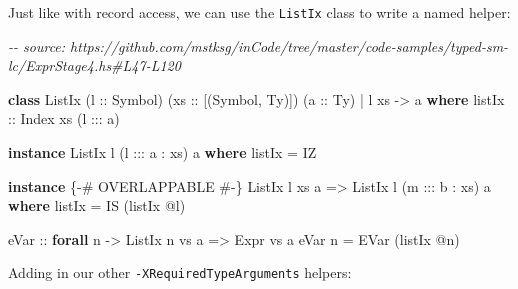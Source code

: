 \documentclass[]{article}
\newenvironment{Shaded}{}{}
\newcommand{\CommentTok}[1]{\textcolor[rgb]{0.38,0.63,0.69}{\textit{#1}}}
\newcommand{\DataTypeTok}[1]{\textcolor[rgb]{0.56,0.13,0.00}{#1}}
\newcommand{\KeywordTok}[1]{\textcolor[rgb]{0.00,0.44,0.13}{\textbf{#1}}}
\newcommand{\NormalTok}[1]{#1}
\newcommand{\OperatorTok}[1]{\textcolor[rgb]{0.40,0.40,0.40}{#1}}
\newcommand{\OtherTok}[1]{\textcolor[rgb]{0.00,0.44,0.13}{#1}}
\begin{document}
Just like with record access, we can use the \texttt{ListIx} class to write a
named helper:

\begin{Shaded}
\begin{Highlighting}[]
\CommentTok{{-}{-} source: https://github.com/mstksg/inCode/tree/master/code{-}samples/typed{-}sm{-}lc/ExprStage4.hs\#L47{-}L120}

\KeywordTok{class} \DataTypeTok{ListIx}\NormalTok{ (}\OtherTok{l ::} \DataTypeTok{Symbol}\NormalTok{) (}\OtherTok{xs ::}\NormalTok{ [(}\DataTypeTok{Symbol}\NormalTok{, }\DataTypeTok{Ty}\NormalTok{)]) (}\OtherTok{a ::} \DataTypeTok{Ty}\NormalTok{) }\OperatorTok{|}\NormalTok{ l xs }\OtherTok{{-}\textgreater{}}\NormalTok{ a }\KeywordTok{where}
\OtherTok{  listIx ::} \DataTypeTok{Index}\NormalTok{ xs (l }\OperatorTok{:::}\NormalTok{ a)}

\KeywordTok{instance} \DataTypeTok{ListIx}\NormalTok{ l (l }\OperatorTok{:::}\NormalTok{ a \textquotesingle{}}\OperatorTok{:}\NormalTok{ xs) a }\KeywordTok{where}
\NormalTok{  listIx }\OtherTok{=} \DataTypeTok{IZ}

\KeywordTok{instance} \OtherTok{\{{-}\# OVERLAPPABLE \#{-}\}} \DataTypeTok{ListIx}\NormalTok{ l xs a }\OtherTok{=\textgreater{}} \DataTypeTok{ListIx}\NormalTok{ l (m }\OperatorTok{:::}\NormalTok{ b \textquotesingle{}}\OperatorTok{:}\NormalTok{ xs) a }\KeywordTok{where}
\NormalTok{  listIx }\OtherTok{=} \DataTypeTok{IS}\NormalTok{ (listIx }\OperatorTok{@}\NormalTok{l)}

\OtherTok{eVar ::} \KeywordTok{forall}\NormalTok{ n }\OtherTok{{-}\textgreater{}} \DataTypeTok{ListIx}\NormalTok{ n vs a }\OtherTok{=\textgreater{}} \DataTypeTok{Expr}\NormalTok{ vs a}
\NormalTok{eVar n }\OtherTok{=} \DataTypeTok{EVar}\NormalTok{ (listIx }\OperatorTok{@}\NormalTok{n)}
\end{Highlighting}
\end{Shaded}

Adding in our other \texttt{-XRequiredTypeArguments} helpers:
\end{document}
